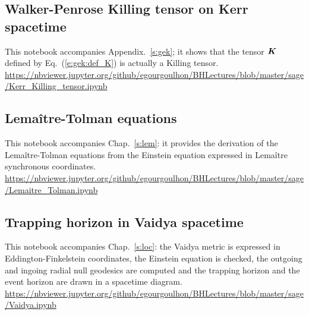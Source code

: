 \subsection{Walker-Penrose Killing tensor on Kerr spacetime} \label{s:sam:Kerr_Killing_tensor}

This notebook accompanies Appendix.~\ref{s:gek}; it shows that the
tensor $\bm{K}$ defined by Eq.~(\ref{e:gek:def_K}) is actually a Killing tensor.\\[1ex]
{\footnotesize
\url{https://nbviewer.jupyter.org/github/egourgoulhon/BHLectures/blob/master/sage/Kerr_Killing_tensor.ipynb}
}


\subsection{Lemaître-Tolman equations} \label{s:sam:Lemaitre-Tolman}

This notebook accompanies Chap.~\ref{s:lem}: it provides the derivation
of the Lemaître-Tolman equations from the Einstein equation expressed in
Lemaître synchronous coordinates.\\[1ex]
{\footnotesize
\url{https://nbviewer.jupyter.org/github/egourgoulhon/BHLectures/blob/master/sage/Lemaitre_Tolman.ipynb}
}

\subsection{Trapping horizon in Vaidya spacetime} \label{s:sam:Vaidya_trapping}

This notebook accompanies Chap.~\ref{s:loc}: the Vaidya metric is expressed in  Eddington-Finkelstein coordinates, the Einstein equation is checked, the outgoing and ingoing radial null geodesics are computed and the trapping horizon and the event
horizon are drawn in a spacetime diagram. \\[1ex]
{\footnotesize
\url{https://nbviewer.jupyter.org/github/egourgoulhon/BHLectures/blob/master/sage/Vaidya.ipynb}
}
